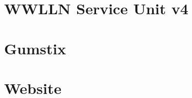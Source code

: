 \documentclass [11pt, twoside] {uwthesis}[2012/06/19]
\begin{document}



\chapter{WWLLN Service Unit v4}
\label{thesis:appendix:su}




\chapter{Gumstix}
\label{thesis:appendix:gumstix}




\chapter{Website}
\label{thesis:appendix:website}



\end{document}
